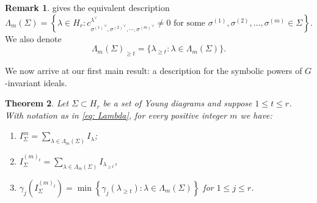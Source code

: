 \documentclass[11pt, reqno]{amsart}
\numberwithin{equation}{section}
\newtheorem{theorem}{Theorem}[section]
\theoremstyle{definition}
\newtheorem{remark}[theorem]{Remark}
\renewcommand{\l}{\lambda}
\newcommand{\s}{\sigma}
\begin{document}
\begin{remark}
 gives the equivalent description
\begin{equation}\label{eq: Lambda}
\Lambda_m(\Sigma)= \left\{ \l \in H_r : c_{{\s^{(1)}}^\vee,{\s^{(2)}}^\vee,\cdots, {\s^{(m)}}^\vee}^{\l^\vee}\neq 0 \text{ for some } \s^{(1)}, \s^{(2)}, \ldots, \s^{(m)}\in \Sigma \right \}.
\end{equation}
We also denote
\[
\Lambda_m(\Sigma)_{\geq t}=\{\l_{\geq t} : \l\in \Lambda_m(\Sigma)\}.
\]
\end{remark}

\noindent We now arrive at our first main result: a description for the symbolic powers of $G$-invariant ideals.

\begin{theorem}\label{lemma: Symbolic power one diagram invariant}
Let $\Sigma\subset H_r$ be a set of Young diagrams and suppose $1\leq t\leq r$.
With notation as in \eqref{eq: Lambda}, for every positive integer $m$ we have:
\begin{enumerate}
\item $I_\Sigma^m=\displaystyle \sum_{\lambda\in\Lambda_m(\Sigma)} I_\lambda$;
\item $I_\Sigma^{(m)_t}= \displaystyle \sum_{\lambda\in\Lambda_m(\Sigma)} I_{\lambda_{\geq t}}$,
\item $\gamma_j \left(I_\Sigma^{(m)_t}\right)= \min \left \{\gamma_j(\l_{\geq t}) : \lambda\in\Lambda_m(\Sigma) \right \} $ for $1\leq j\leq r$.
\end{enumerate}
\end{theorem}
\end{document}
